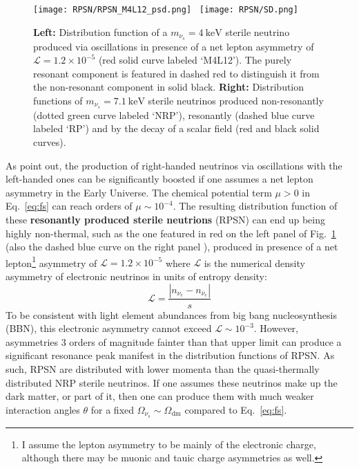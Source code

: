 \begin{figure}
\begin{center}
\texttt{[image: RPSN/RPSN\_M4L12\_psd.png]}~%
\texttt{[image: RPSN/SD.png]}
\caption{\textbf{Left:} Distribution function of a $m_{\nu_s} = 4~\mathrm{keV}$ sterile neutrino produced via oscillations in presence of a net lepton asymmetry of $\mathcal{L} = 1.2 \times 10^{-5}$ (red solid curve labeled `M4L12'). The purely resonant component is featured in dashed red to distinguish it from the non-resonant component in solid black. \textbf{Right:} Distribution functions of $m_{\nu_s} = 7.1~\mathrm{keV}$ sterile neutrinos produced non-resonantly (dotted green curve labeled `NRP'), resonantly (dashed blue curve labeled `RP') and by the decay of a scalar field (red and black solid curves).}
\label{fig:M4L12_fs}
\end{center}
\end{figure}


As \cite{ShiFuller99} point out, the production of right-handed neutrinos via oscillations with the left-handed ones can be significantly boosted if one assumes a net lepton asymmetry in the Early Universe. The chemical potential term $\mu > 0$ in Eq.~\ref{eq:fs} can reach orders of $\mu \sim 10^{-4}$. The resulting distribution function of these \textbf{resonantly produced sterile neutrions} (RPSN) can end up being highly non-thermal, such as the one featured in red on the left panel of Fig.~\ref{fig:M4L12_fs} (also the dashed blue curve on the right panel ), produced in presence of a net lepton\footnote{I assume the lepton asymmetry to be mainly of the electronic charge, although there may be muonic and tauic charge asymmetries as well.} asymmetry of $\mathcal{L} = 1.2 \times 10^{-5}$ where $\mathcal{L}$ is the numerical density asymmetry of electronic neutrinos in units of entropy density:
\begin{equation}
\mathcal{L} = \frac{\left\vert n_{\nu_e} - n_{\bar{\nu}_e} \right\vert}{s}
\end{equation} To be consistent with light element abundances from big bang nucleosynthesis (BBN), this electronic asymmetry cannot exceed $\mathcal{L} \sim 10^{-3}$. However, asymmetries 3 orders of magnitude fainter than that upper limit can produce a significant resonance peak manifest in the distribution functions of RPSN. As such, RPSN are distributed with lower momenta than the quasi-thermally distributed NRP sterile neutrinos. If one assumes these neutrinos make up the dark matter, or part of it, then one can produce them with much weaker interaction angles $\theta$ for a fixed $\Omega_{\nu_s} \sim \Omega_{\mathrm{dm}}$ compared to Eq.~\ref{eq:fs}. \\


